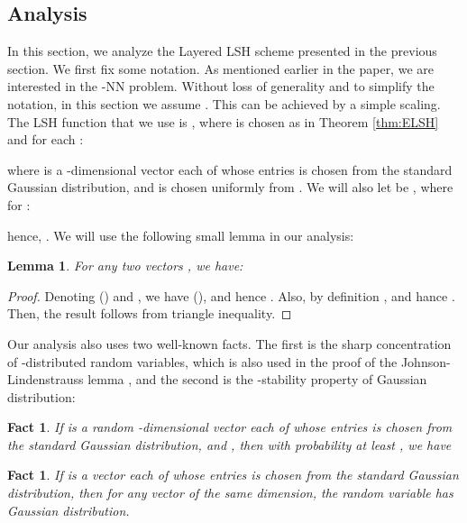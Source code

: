\documentclass{acm_proc_article-sp}
\numberwithin{equation}{section}
\numberwithin{figure}{section}
\newtheorem{lemma}[thm]{Lemma}
\newtheorem{fact}[thm]{Fact}
\begin{document}
\subsection{Analysis}
\label{sec:analysis}

In this section, we analyze the Layered LSH scheme presented in the previous section. We first fix some notation. As mentioned earlier in the paper, we are interested in the -NN problem. Without loss of generality and to simplify the notation, in this section we assume . This can be achieved by a simple scaling.
The LSH function  that we use is , where  is chosen as in Theorem \ref{thm:ELSH} and for each :
 
where  is a -dimensional vector each of whose entries is chosen from the standard Gaussian  distribution, and  is chosen uniformly from . We will also let  be , where for :

hence, . We will use the following small lemma in our analysis:
\begin{lemma} \label{lem:trieq} For any two vectors , we have:

\end{lemma}
\begin{proof}
Denoting  () and , we have  (), and hence . Also, by definition , and hance . Then, the result follows from triangle inequality.
\end{proof}
Our analysis also uses two well-known facts. The first is the sharp concentration of -distributed random variables, which is also used in the proof of the Johnson-Lindenstrauss lemma \cite{im98, Dasgupta_JL}, and the second is the -stability property of Gaussian distribution:

\begin{fact} \label{fact:sharpcon} If  is a random -dimensional vector each of whose entries is chosen from the standard Gaussian  distribution, and , then with probability at least , we have 
\end{fact}

\begin{fact} \label{fact:2stable} If  is a vector each of whose entries is chosen from the standard Gaussian  distribution, then for any vector  of the same dimension, the random variable  has Gaussian  distribution.
\end{fact}
\end{document}
